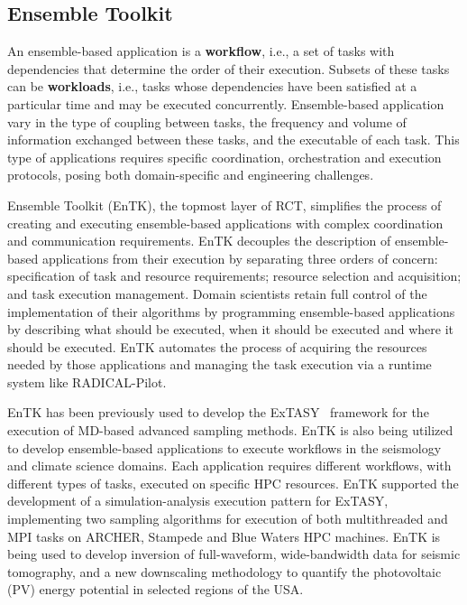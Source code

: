 \subsection{Ensemble Toolkit}

An ensemble-based application is a \textbf{workflow}, i.e., a set of tasks
with dependencies that determine the order of their execution. Subsets of
these tasks can be \textbf{workloads}, i.e., tasks whose dependencies have
been satisfied at a particular time and may be executed concurrently.
Ensemble-based application vary in the type of coupling between tasks, the
frequency and volume of information exchanged between these tasks, and the
executable of each task. This type of applications requires specific
coordination, orchestration and execution protocols, posing both
domain-specific and engineering challenges.

Ensemble Toolkit (EnTK), the topmost layer of RCT, simplifies the process of
creating and executing ensemble-based applications with complex coordination
and communication requirements. EnTK decouples the description of
ensemble-based applications from their execution by separating three orders
of concern: specification of task and resource requirements; resource
selection and acquisition; and task execution management. Domain scientists
retain full control of the implementation of their algorithms by programming
ensemble-based applications by describing what should be executed, when it
should be executed and where it should be executed. EnTK automates the
process of acquiring the resources needed by those applications and managing
the task execution via a runtime system like RADICAL-Pilot.


EnTK has been previously used to develop the
ExTASY~\cite{balasubramanian2016extasy} framework for the execution of
MD-based advanced sampling methods. EnTK is also being utilized to develop
ensemble-based applications to execute workflows in the seismology and
climate science domains. Each application requires different workflows, with
different types of tasks, executed on specific HPC resources. EnTK supported
the development of a simulation-analysis execution pattern for ExTASY,
implementing two sampling algorithms for execution of both multithreaded and
MPI tasks on ARCHER, Stampede and Blue Waters HPC machines. EnTK is being
used to develop inversion of full-waveform, wide-bandwidth data for seismic
tomography, and a new downscaling methodology to quantify the photovoltaic
(PV) energy potential in selected regions of the USA\@.

